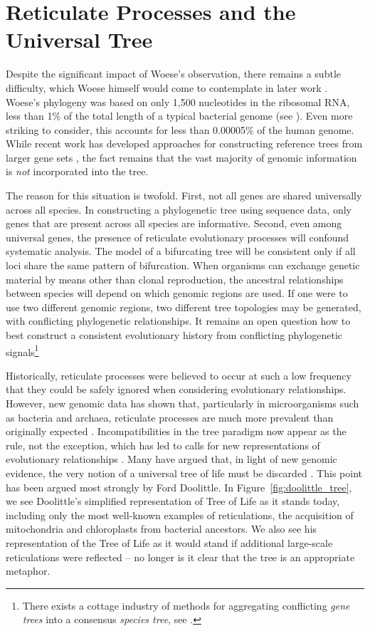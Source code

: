 \section{Reticulate Processes and the Universal Tree}

Despite the significant impact of Woese's observation, there remains a subtle difficulty, which Woese himself would come to contemplate in later work \cite{Woese:2004ba,Goldenfeld:2007im}.
Woese's phylogeny was based on only 1,500 nucleotides in the ribosomal RNA, less than 1\% of the total length of a typical bacterial genome (see \cite{Dagan:2006up}).
Even more striking to consider, this accounts for less than 0.00005\% of the human genome.
While recent work has developed approaches for constructing reference trees from larger gene sets \cite{Ciccarelli:2006gw}, the fact remains that the vast majority of genomic information is \emph{not} incorporated into the tree.

The reason for this situation is twofold.
First, not all genes are shared universally across all species.
In constructing a phylogenetic tree using sequence data, only genes that are present across all species are informative.
Second, even among universal genes, the presence of reticulate evolutionary processes will confound systematic analysis.
The model of a bifurcating tree will be consistent only if all loci share the same pattern of bifurcation.
When organisms can exchange genetic material by means other than clonal reproduction, the ancestral relationships between species will depend on which genomic regions are used.
If one were to use two different genomic regions, two different tree topologies may be generated, with conflicting phylogenetic relationships.
It remains an open question how to best construct a consistent evolutionary history from conflicting phylogenetic signals\footnote{There exists a cottage industry of methods for aggregating conflicting \emph{gene trees} into a consensus \emph{species tree}, see \cite{Maddison:1997ew}.}

Historically, reticulate processes were believed to occur at such a low frequency that they could be safely ignored when considering evolutionary relationships.
However, new genomic data has shown that, particularly in microorganisms such as bacteria and archaea, reticulate processes are much more prevalent than originally expected \cite{Ochman:2000dr}.
Incompatibilities in the tree paradigm now appear as the rule, not the exception, which has led to calls for new representations of evolutionary relationships \cite{Doolittle:1999,Doolittle:2006}.
Many have argued that, in light of new genomic evidence, the very notion of a universal tree of life must be discarded \cite{Koonin:2008bt,Koonin:2008tj}.
This point has been argued most strongly by Ford Doolittle.
In Figure~\ref{fig:doolittle_tree}, we see Doolittle's simplified representation of Tree of Life as it stands today, including only the most well-known examples of reticulations, the acquisition of mitochondria and chloroplasts from bacterial ancestors.
We also see his representation of the Tree of Life as it would stand if additional large-scale reticulations were reflected -- no longer is it clear that the tree is an appropriate metaphor.

